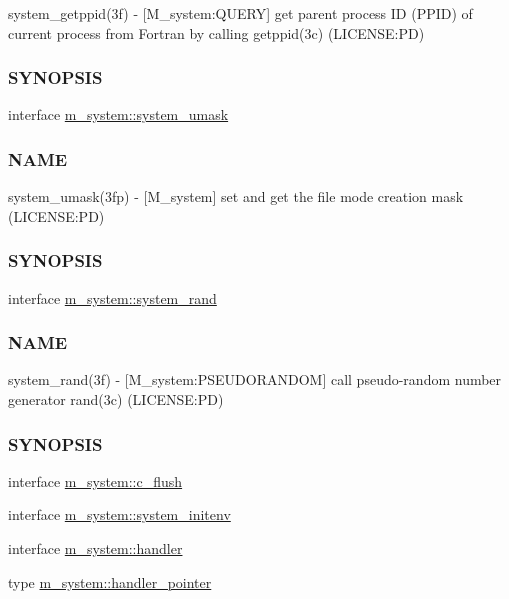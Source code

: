 \begin{DoxyCompactItemize}
\begin{DoxyCompactList}
system\+\_\+getppid(3f) -\/ \mbox{[}M\+\_\+system\+:Q\+U\+E\+RY\mbox{]} get parent process ID (P\+P\+ID) of current process from Fortran by calling getppid(3c) (L\+I\+C\+E\+N\+SE\+:PD) \subsubsection*{S\+Y\+N\+O\+P\+S\+IS}\end{DoxyCompactList}\item 
interface \mbox{\hyperlink{interfacem__system_1_1system__umask}{m\+\_\+system\+::system\+\_\+umask}}
\begin{DoxyCompactList}\small\item\em \subsubsection*{N\+A\+ME}

system\+\_\+umask(3fp) -\/ \mbox{[}M\+\_\+system\mbox{]} set and get the file mode creation mask (L\+I\+C\+E\+N\+SE\+:PD) \subsubsection*{S\+Y\+N\+O\+P\+S\+IS}\end{DoxyCompactList}\item 
interface \mbox{\hyperlink{interfacem__system_1_1system__rand}{m\+\_\+system\+::system\+\_\+rand}}
\begin{DoxyCompactList}\small\item\em \subsubsection*{N\+A\+ME}

system\+\_\+rand(3f) -\/ \mbox{[}M\+\_\+system\+:P\+S\+E\+U\+D\+O\+R\+A\+N\+D\+OM\mbox{]} call pseudo-\/random number generator rand(3c) (L\+I\+C\+E\+N\+SE\+:PD) \subsubsection*{S\+Y\+N\+O\+P\+S\+IS}\end{DoxyCompactList}\item 
interface \mbox{\hyperlink{interfacem__system_1_1c__flush}{m\+\_\+system\+::c\+\_\+flush}}
\item 
interface \mbox{\hyperlink{interfacem__system_1_1system__initenv}{m\+\_\+system\+::system\+\_\+initenv}}
\item 
interface \mbox{\hyperlink{interfacem__system_1_1handler}{m\+\_\+system\+::handler}}
\item 
type \mbox{\hyperlink{structm__system_1_1handler__pointer}{m\+\_\+system\+::handler\+\_\+pointer}}
\end{DoxyCompactItemize}
